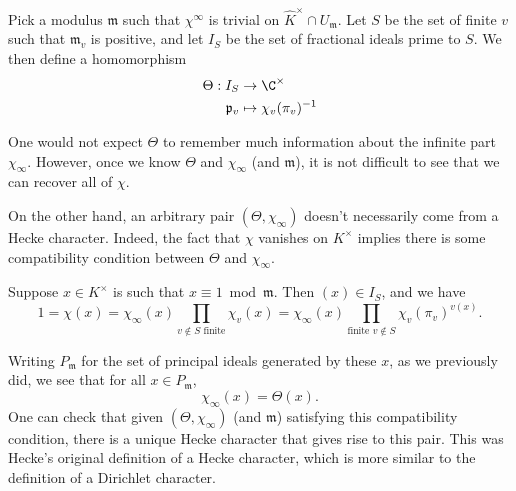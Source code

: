 \documentclass[a4paper]{article}
\begin{document}
Pick a modulus $\mathfrak{m}$ such that $\chi^\infty$ is trivial on $\hat{K}^\times \cap U_\mathfrak{m}$. Let $S$ be the set of finite $v$ such that $\mathfrak{m}_v$ is positive, and let $I_S$ be the set of fractional ideals prime to $S$. We then define a homomorphism
\begin{align*}
  \Theta: I_S &\to \C^\times\\
  \mathfrak{p}_v &\mapsto \chi_v(\pi_v)^{-1}
\end{align*}

One would not expect $\Theta$ to remember much information about the infinite part $\chi_\infty$. However, once we know $\Theta$ and $\chi_\infty$ (and $\mathfrak{m}$), it is not difficult to see that we can recover all of $\chi$.

On the other hand, an arbitrary pair $(\Theta, \chi_\infty)$ doesn't necessarily come from a Hecke character. Indeed, the fact that $\chi$ vanishes on $K^\times$ implies there is some compatibility condition between $\Theta$ and $\chi_\infty$.

Suppose $x \in K^\times$ is such that $x \equiv 1 \bmod \mathfrak{m}$. Then $(x) \in I_S$, and we have
\[
  1 = \chi(x) = \chi_\infty(x) \prod_{v \not \in S\text{ finite}} \chi_v(x) = \chi_\infty(x) \prod_{\text{finite }v \not \in S} \chi_v(\pi_v)^{v(x)}.
\]

Writing $P_\mathfrak{m}$ for the set of principal ideals generated by these $x$, as we previously did, we see that for all $x \in P_\mathfrak{m}$,
\[
  \chi_\infty(x) = \Theta(x).
\]
One can check that given $(\Theta, \chi_\infty)$ (and $\mathfrak{m}$) satisfying this compatibility condition, there is a unique Hecke character that gives rise to this pair. This was Hecke's original definition of a Hecke character, which is more similar to the definition of a Dirichlet character.
\end{document}
